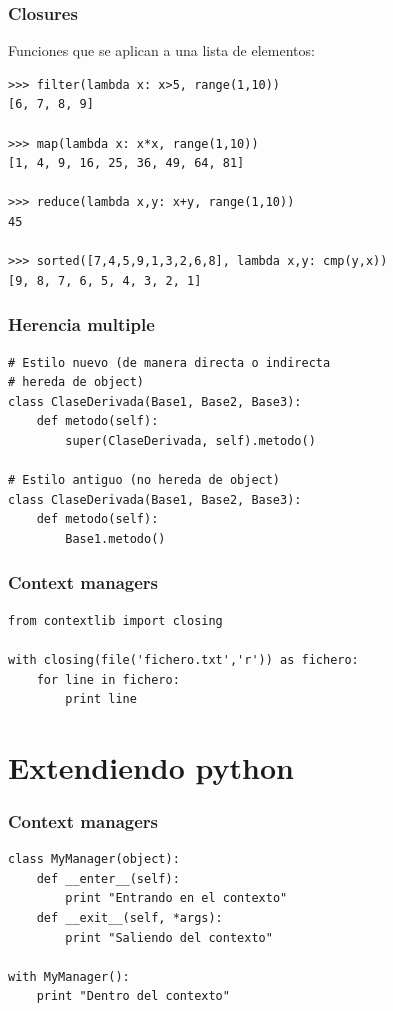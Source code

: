 \documentclass[10pt]{beamer}
\begin{document}
  \begin{frame}[containsverbatim]
    \frametitle{Closures}
Funciones que se aplican a una lista de elementos:
    \begin{verbatim}
>>> filter(lambda x: x>5, range(1,10))
[6, 7, 8, 9]

>>> map(lambda x: x*x, range(1,10))
[1, 4, 9, 16, 25, 36, 49, 64, 81]

>>> reduce(lambda x,y: x+y, range(1,10))
45

>>> sorted([7,4,5,9,1,3,2,6,8], lambda x,y: cmp(y,x))
[9, 8, 7, 6, 5, 4, 3, 2, 1]
    \end{verbatim}
  \end{frame}

  \begin{frame}[containsverbatim]
    \frametitle{Herencia multiple}
    \begin{verbatim}
# Estilo nuevo (de manera directa o indirecta
# hereda de object)
class ClaseDerivada(Base1, Base2, Base3):
    def metodo(self):
        super(ClaseDerivada, self).metodo()

# Estilo antiguo (no hereda de object)
class ClaseDerivada(Base1, Base2, Base3):
    def metodo(self):
        Base1.metodo()
    \end{verbatim}
  \end{frame}

  \begin{frame}[containsverbatim]
    \frametitle{Context managers}
    \begin{verbatim}
from contextlib import closing

with closing(file('fichero.txt','r')) as fichero:
    for line in fichero:
        print line
    \end{verbatim}
  \end{frame}

  \section{Extendiendo python}

  \begin{frame}[containsverbatim]
    \frametitle{Context managers}
    \begin{verbatim}
class MyManager(object):
    def __enter__(self):
        print "Entrando en el contexto"
    def __exit__(self, *args):
        print "Saliendo del contexto"

with MyManager():
    print "Dentro del contexto"
    \end{verbatim}
  \end{frame}
\end{document}
